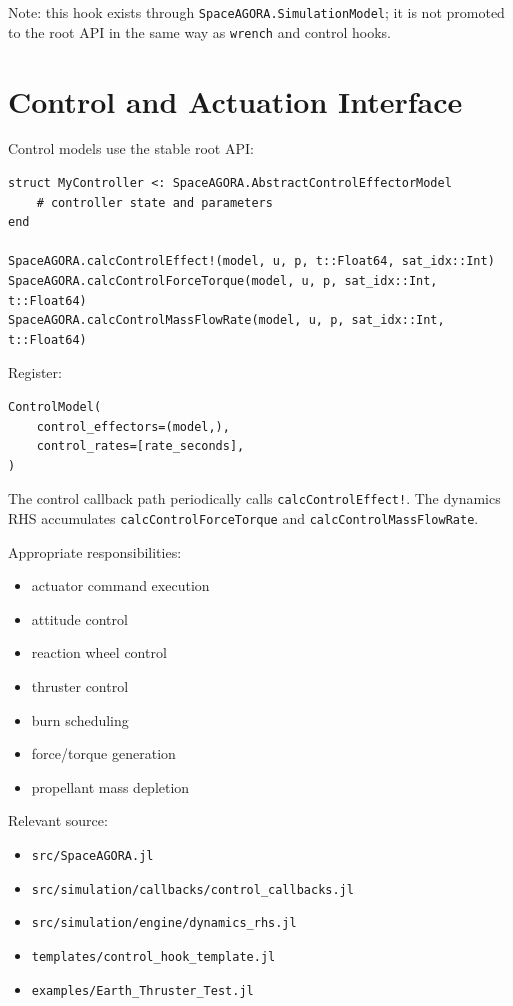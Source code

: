 \documentclass[11pt]{article}
\begin{document}
Note: this hook exists through \texttt{SpaceAGORA.SimulationModel}; it is not
promoted to the root API in the same way as \texttt{wrench} and control hooks.

\section{Control and Actuation Interface}

Control models use the stable root API:

\begin{lstlisting}
struct MyController <: SpaceAGORA.AbstractControlEffectorModel
    # controller state and parameters
end

SpaceAGORA.calcControlEffect!(model, u, p, t::Float64, sat_idx::Int)
SpaceAGORA.calcControlForceTorque(model, u, p, sat_idx::Int, t::Float64)
SpaceAGORA.calcControlMassFlowRate(model, u, p, sat_idx::Int, t::Float64)
\end{lstlisting}

Register:

\begin{lstlisting}
ControlModel(
    control_effectors=(model,),
    control_rates=[rate_seconds],
)
\end{lstlisting}

The control callback path periodically calls \texttt{calcControlEffect!}. The
dynamics RHS accumulates \texttt{calcControlForceTorque} and
\texttt{calcControlMassFlowRate}.

Appropriate responsibilities:
\begin{itemize}
  \item actuator command execution
  \item attitude control
  \item reaction wheel control
  \item thruster control
  \item burn scheduling
  \item force/torque generation
  \item propellant mass depletion
\end{itemize}

Relevant source:
\begin{itemize}
  \item \texttt{src/SpaceAGORA.jl}
  \item \texttt{src/simulation/callbacks/control\_callbacks.jl}
  \item \texttt{src/simulation/engine/dynamics\_rhs.jl}
  \item \texttt{templates/control\_hook\_template.jl}
  \item \texttt{examples/Earth\_Thruster\_Test.jl}
\end{itemize}
\end{document}
